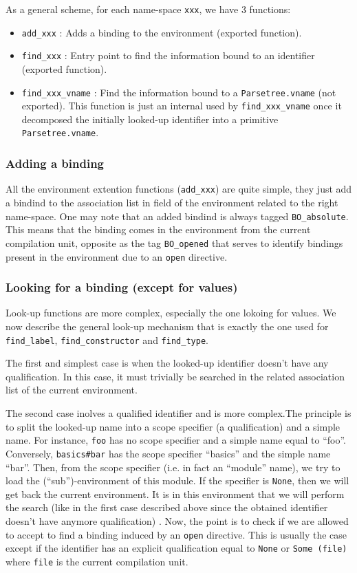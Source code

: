 As a general scheme, for each name-space {\tt xxx}, we have 3
functions:
\begin{itemize}
\item {\tt add\_xxx} : Adds a binding to the environment (exported
  function).
\item {\tt find\_xxx} : Entry point to find the information bound to
  an identifier (exported function).
\item {\tt find\_xxx\_vname} : Find the information bound to a
{\tt Parsetree.vname} (not exported). This function is just an
internal used by {\tt find\_xxx\_vname} once it decomposed the
initially looked-up identifier into a primitive
{\tt Parsetree.vname}.
\end{itemize}



\subsubsection{Adding a binding}
All the environment extention functions ({\tt add\_xxx}) are quite
simple, they just add a bindind to the association list in field of
the environment related to the right name-space. One may note that an
added bindind is always tagged {\tt BO\_absolute}. This means that the
binding comes in the environment from the current compilation unit,
opposite as the tag {\tt BO\_opened} that serves to identify bindings
present in the environment due to an {\tt open} directive.



\subsubsection{Looking for a binding (except for values)}
Look-up functions are more complex, especially the one lokoing for
values. We now describe the general look-up mechanism that is exactly
the one used for {\tt find\_label}, {\tt find\_constructor} and
{\tt find\_type}.

\medskip
The first and simplest case is when the looked-up identifier doesn't
have any qualification. In this case, it must trivially be searched in
the related association list of the current environment.

The second case inolves a qualified identifier and is more complex.The
principle is to split the looked-up name into a scope specifier (a
qualification) and a simple name. For instance, {\tt foo} has no scope
specifier and a simple name equal to ``foo''. Conversely,
{\tt basics\#bar} has the scope specifier ``basics'' and the simple
name ``bar''.
Then, from the scope specifier (i.e. in fact an ``module'' name), we
try to load the (``sub'')-environment of this module. If the specifier
is {\tt None}, then we will get back the current environment. It is in
this environment that we will perform the search (like in the first
case described above since the obtained identifier doesn't have
anymore qualification) . Now, the point is to check if we are allowed
to accept to find a binding induced by an {\tt open} directive. This
is usually the case except if the identifier has an explicit
qualification equal to {\tt None} or {\tt Some (file)} where
{\tt file} is the current compilation unit. 

